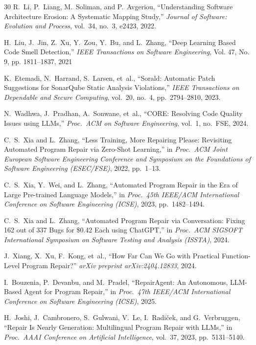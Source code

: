 \documentclass[conference]{IEEEtran}
\begin{document}
\begin{thebibliography}{30}
R.~Li, P.~Liang, M.~Soliman, and P.~Avgeriou,
``Understanding Software Architecture Erosion: A Systematic Mapping Study,''
\emph{Journal of Software: Evolution and Process}, vol.~34, no.~3, e2423, 2022.

H.~Liu, J.~Jin, Z.~Xu, Y.~Zou, Y.~Bu, and L.~Zhang,
``Deep Learning Based Code Smell Detection,''
\emph{IEEE Transactions on Software Engineering}, Vol. 47, No. 9, pp. 1811–1837, 2021

K.~Etemadi, N.~Harrand, S.~Larsen, et~al.,
``Sorald: Automatic Patch Suggestions for SonarQube Static Analysis Violations,''
\emph{IEEE Transactions on Dependable and Secure Computing}, vol.~20, no.~4, pp.~2794--2810, 2023.

N.~Wadhwa, J.~Pradhan, A.~Sonwane, et~al.,
``CORE: Resolving Code Quality Issues using LLMs,''
\emph{Proc.\ ACM on Software Engineering}, vol.~1, no.~FSE, 2024.


C.~S.~Xia and L.~Zhang,
``Less Training, More Repairing Please: Revisiting Automated Program Repair via Zero-Shot Learning,''
in \emph{Proc.\ ACM Joint European Software Engineering Conference and Symposium on the Foundations of Software Engineering (ESEC/FSE)}, 2022, pp.~1--13.

C.~S.~Xia, Y.~Wei, and L.~Zhang,
``Automated Program Repair in the Era of Large Pre-trained Language Models,''
in \emph{Proc.\ 45th IEEE/ACM International Conference on Software Engineering (ICSE)}, 2023, pp.~1482--1494.

C.~S.~Xia and L.~Zhang,
``Automated Program Repair via Conversation: Fixing 162 out of 337 Bugs for \$0.42 Each using ChatGPT,''
in \emph{Proc.\ ACM SIGSOFT International Symposium on Software Testing and Analysis (ISSTA)}, 2024.

J.~Xiang, X.~Xu, F.~Kong, et~al.,
``How Far Can We Go with Practical Function-Level Program Repair?''
\emph{arXiv preprint arXiv:2404.12833}, 2024.

I.~Bouzenia, P.~Devanbu, and M.~Pradel,
``RepairAgent: An Autonomous, LLM-Based Agent for Program Repair,''
in \emph{Proc.\ 47th IEEE/ACM International Conference on Software Engineering (ICSE)}, 2025.

H.~Joshi, J.~Cambronero, S.~Gulwani, V.~Le, I.~Radi{\v{c}}ek, and G.~Verbruggen,
``Repair Is Nearly Generation: Multilingual Program Repair with LLMs,''
in \emph{Proc.\ AAAI Conference on Artificial Intelligence}, vol.~37, 2023, pp.~5131--5140.


\end{thebibliography}
\end{document}
